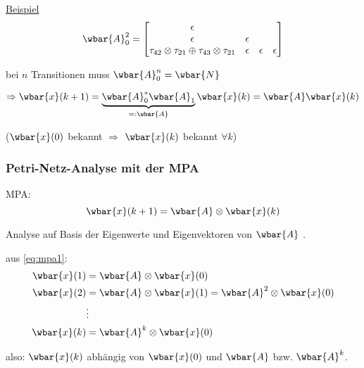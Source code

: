 \underline{Beispiel}
\begin{equation}
	\wbar{A}_0^2 =
	\begin{bmatrix}
		\epsilon \\
		\epsilon & \epsilon \\
		\tau_{42} \otimes \tau_{21} \oplus \tau_{43} \otimes \tau_{21} & \epsilon & \epsilon & \epsilon\\
	\end{bmatrix}
\end{equation}

bei $n$ Transitionen muss $\wbar{A}_0^n = \wbar{N}$

\begin{equation}
	\Rightarrow \wbar{x}(k+1) = \underbrace{\wbar{A}_0^\ast \wbar{A}_1}_{=:\wbar{A}} \wbar{x}(k) = \wbar{A} \wbar{x}(k)
\end{equation}

($\wbar{x}(0)$ bekannt $\Rightarrow$ $\wbar{x}(k)$ bekannt $\forall k$)

\subsubsection{Petri-Netz-Analyse mit der MPA}
MPA: 
\begin{equation}
\label{eq:mpa1}
	\wbar{x}(k+1) = \wbar{A} \otimes \wbar{x}(k)
\end{equation}

Analyse auf Basis der Eigenwerte und Eigenvektoren von $\wbar{A}$ .

aus \ref{eq:mpa1}:
\begin{align}
	\wbar{x}(1) &= \wbar{A} \otimes \wbar{x}(0) \\
	\wbar{x}(2) &= \wbar{A} \otimes \wbar{x}(1) = \wbar{A}^2 \otimes \wbar{x}(0) \\
	            &\vdots \nonumber \\
	\wbar{x}(k) &= \wbar{A}^k \otimes \wbar{x}(0) \label{eq:mpa2}
\end{align}

also: $\wbar{x}(k)$ abhängig von $\wbar{x}(0)$ und $\wbar{A}$ bzw. $\wbar{A}^k$.

